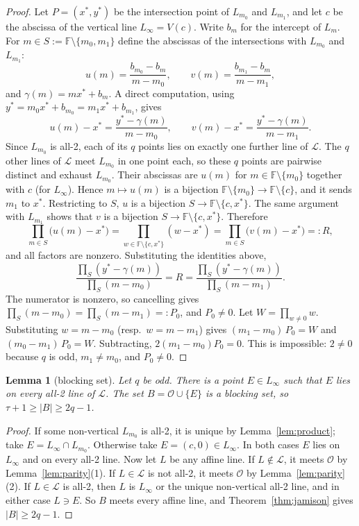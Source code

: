 \documentclass[11pt,a4paper]{article}
\newtheorem{lemma}[theorem]{Lemma}
\theoremstyle{definition}
\theoremstyle{remark}
\newcommand{\F}{\mathbb{F}}
\newcommand{\Lset}{\mathcal{L}}
\newcommand{\Oset}{\mathcal{O}}
\begin{document}
\begin{proof}
Let $P=(x^*,y^*)$ be the intersection point of $L_{m_0}$ and $L_{m_1}$, and let $c$ be the abscissa
of the vertical line $L_\infty=V(c)$. Write $b_m$ for the intercept of $L_m$. For $m\in S:=\F\setminus\{m_0,m_1\}$
define the abscissas of the intersections with $L_{m_0}$ and $L_{m_1}$:
\[
u(m)=\frac{b_{m_0}-b_m}{m-m_0},\qquad v(m)=\frac{b_{m_1}-b_m}{m-m_1},
\]
and $\gamma(m)=m x^*+b_m$. A direct computation, using $y^*=m_0x^*+b_{m_0}=m_1x^*+b_{m_1}$, gives
\[
u(m)-x^*=\frac{y^*-\gamma(m)}{m-m_0},\qquad v(m)-x^*=\frac{y^*-\gamma(m)}{m-m_1}.
\]
Since $L_{m_0}$ is all-2, each of its $q$ points lies on exactly one further line of $\Lset$. The
$q$ other lines of $\Lset$ meet $L_{m_0}$ in one point each, so these $q$ points are pairwise
distinct and exhaust $L_{m_0}$. Their abscissas are $u(m)$ for $m\in\F\setminus\{m_0\}$ together with
$c$ (for $L_\infty$). Hence $m\mapsto u(m)$ is a bijection $\F\setminus\{m_0\}\to\F\setminus\{c\}$, and
it sends $m_1$ to $x^*$. Restricting to $S$, $u$ is a bijection $S\to\F\setminus\{c,x^*\}$. The same
argument with $L_{m_1}$ shows that $v$ is a bijection $S\to\F\setminus\{c,x^*\}$. Therefore
\[
\prod_{m\in S}\bigl(u(m)-x^*\bigr)=\prod_{w\in\F\setminus\{c,x^*\}}(w-x^*)=\prod_{m\in S}\bigl(v(m)-x^*\bigr)=:R,
\]
and all factors are nonzero. Substituting the identities above,
\[
\frac{\prod_{S}(y^*-\gamma(m))}{\prod_{S}(m-m_0)}=R=\frac{\prod_{S}(y^*-\gamma(m))}{\prod_{S}(m-m_1)}.
\]
The numerator is nonzero, so cancelling gives $\prod_{S}(m-m_0)=\prod_{S}(m-m_1)=:P_0$, and $P_0\ne0$.
Let $W=\prod_{w\ne0}w$. Substituting $w=m-m_0$ (resp.\ $w=m-m_1$) gives
$(m_1-m_0)\,P_0=W$ and $(m_0-m_1)\,P_0=W$. Subtracting, $2(m_1-m_0)P_0=0$. This is impossible:
$2\ne0$ because $q$ is odd, $m_1\ne m_0$, and $P_0\ne0$.
\end{proof}

\begin{lemma}[blocking set]\label{lem:block}
Let $q$ be odd. There is a point $E\in L_\infty$ such that $E$ lies on every all-2 line of $\Lset$.
The set $B=\Oset\cup\{E\}$ is a blocking set, so $\tau+1\ge|B|\ge 2q-1$.
\end{lemma}

\begin{proof}
If some non-vertical $L_{m_0}$ is all-2, it is unique by Lemma~\ref{lem:product}; take
$E=L_\infty\cap L_{m_0}$. Otherwise take $E=(c,0)\in L_\infty$. In both cases $E$ lies on $L_\infty$
and on every all-2 line. Now let $L$ be any affine line. If $L\notin\Lset$, it meets $\Oset$ by
Lemma~\ref{lem:parity}(1). If $L\in\Lset$ is not all-2, it meets $\Oset$ by Lemma~\ref{lem:parity}(2).
If $L\in\Lset$ is all-2, then $L$ is $L_\infty$ or the unique non-vertical all-2 line, and in either
case $L\ni E$. So $B$ meets every affine line, and Theorem~\ref{thm:jamison} gives $|B|\ge2q-1$.
\end{proof}
\end{document}
